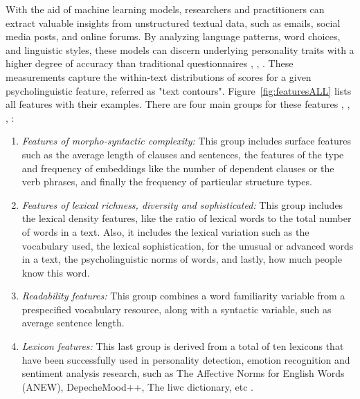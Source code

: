 With the aid of machine learning models, researchers and practitioners can extract valuable insights from unstructured textual data, such as emails, social media posts, and online forums. By analyzing language patterns, word choices, and linguistic styles, these models can discern underlying personality traits with a higher degree of accuracy than traditional questionnaires \cite{kerz2022pushing}, \cite{volkova2015inferring}, \cite{akrami2019automatic}. These measurements capture the within-text distributions of scores for a given psycholinguistic feature, referred as "text contours". Figure~\ref{fig:featuresALL} lists all features with their examples. There are four main groups for these features  \cite{kerz2022pushing}, \cite{tandera2017personality}, \cite{vinciarelli2014survey}, \cite{el2022deep}:
\begin{enumerate}
\item \textit{Features of morpho-syntactic complexity:}
This group includes surface features such as the average length of clauses and sentences, the features of the type and frequency of embeddings like the number of dependent clauses or the verb phrases, and finally the frequency of particular structure types.

\item \textit{Features of lexical richness, diversity and sophisticated:}
This group includes the lexical density features, like the ratio of lexical words to the total number of words in a text. Also, it includes the lexical variation such as the vocabulary used, the lexical sophistication, for the unusual or advanced words in a text, the psycholinguistic norms of words, and lastly, how much people know this word.

\item \textit{Readability features:}
This group combines a word familiarity variable from a prespecified vocabulary resource, along with a syntactic variable, such as average sentence length.

\item \textit{Lexicon features:}
This last group is derived from a total of ten lexicons that have been successfully used in personality detection, emotion recognition and sentiment analysis research, such as The Affective Norms for English Words (ANEW), DepecheMood++, The \ac{liwc} dictionary, etc \cite{pennebaker1999linguistic}.
\end{enumerate}

